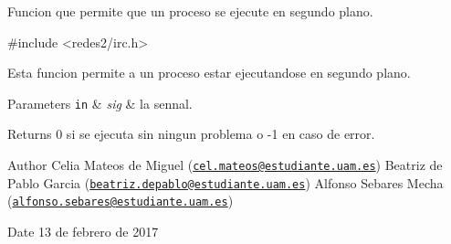 Funcion que permite que un proceso se ejecute en segundo plano.


\begin{DoxyCode}
\textcolor{preprocessor}{#include <redes2/irc.h>}
\end{DoxyCode}


Esta funcion permite a un proceso estar ejecutandose en segundo plano.


\begin{DoxyParams}[1]{Parameters}
\mbox{\tt in}  & {\em sig} & la sennal.\\
\hline
\end{DoxyParams}
\begin{DoxyReturn}{Returns}
0 si se ejecuta sin ningun problema o -\/1 en caso de error.
\end{DoxyReturn}
\begin{DoxyAuthor}{Author}
Celia Mateos de Miguel (\href{mailto:cel.mateos@estudiante.uam.es}{\tt cel.\+mateos@estudiante.\+uam.\+es}) Beatriz de Pablo Garcia (\href{mailto:beatriz.depablo@estudiante.uam.es}{\tt beatriz.\+depablo@estudiante.\+uam.\+es}) Alfonso Sebares Mecha (\href{mailto:alfonso.sebares@estudiante.uam.es}{\tt alfonso.\+sebares@estudiante.\+uam.\+es})
\end{DoxyAuthor}
\begin{DoxyDate}{Date}
13 de febrero de 2017
\end{DoxyDate}


 